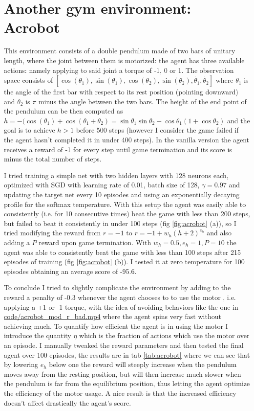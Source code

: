 \documentclass[a4paper, 11pt]{article}
\begin{document}
\section{Another gym environment: Acrobot}
  This environment consists of a double pendulum made of two bars of unitary length, where the joint between them is motorized: the agent has three available actions: namely applying to said joint a torque of -1, 0 or 1. The observation space consists of $[\cos(\theta_1), \sin(\theta_1), \cos(\theta_2), \sin(\theta_2), \dot{\theta_1}, \dot{\theta_2}]$ where $\theta_1$ is the angle of the first bar with respect to its rest position (pointing downward) and $\theta_2$ is $\pi$ minus the angle between the two bars.
  The height of the end point of the pendulum can be then computed as $h = -(\cos(\theta_1) + \cos(\theta_1 + \theta_2) = \sin\theta_1\sin\theta_2 - \cos\theta_1 (1 + \cos\theta_2)$ and the goal is to achieve $h > 1$ before 500 steps (however I consider the game failed if the agent hasn't completed it in under 400 steps). In the vanilla version the agent receives a reward of -1 for every step until game termination and its score is minus the total number of steps.

  I tried training a simple net with two hidden layers with 128 neurons each, optimized with SGD with learning rate of 0.01, batch size of 128, $\gamma=0.97$  and updating the target net every 10 episodes and using an exponentially decaying profile for the softmax temperature.
  With this setup the agent was easily able to consistently (i.e. for 10 consecutive times) beat the game with less than 200 steps, but failed to beat it consistently in under 100 steps (fig \ref{fig:acrobot} (a)), so I tried modifying the reward from $r = -1$ to $r = -1 + w_h(h+2)^{e_h}$ and also adding a $P$ reward upon game termination. With $w_h=0.5, e_h=1, P=10$ the agent was able to consistently beat the game with less than 100 steps after 215 episodes of training (fig \ref{fig:acrobot} (b)). I tested it at zero temperature for 100 episodes obtaining an average score of -95.6.

  To conclude I tried to slightly complicate the environment by adding to the reward a penalty of -0.3 whenever the agent chooses to to use the motor , i.e. applying a +1 or -1 torque, with the idea of avoiding behaviors like the one in \url{code/acrobot_mod_r_bad.mp4} where the agent spins very fast without achieving much. To quantify how efficient the agent is in using the motor I introduce the quantity $\eta$ which is the fraction of actions which use the motor over an episode. I manually tweaked the reward parameters and then tested the final agent over 100 episodes, the results are in tab \ref{tab:acrobot} where we can see that by lowering $e_h$ below one the reward will steeply increase when the pendulum moves away from the resting position, but will then increase much slower when the pendulum is far from the equilibrium position, thus letting the agent optimize the efficiency of the motor usage. A nice result is that the increased efficiency doesn't affect drastically the agent's score.
\end{document}
